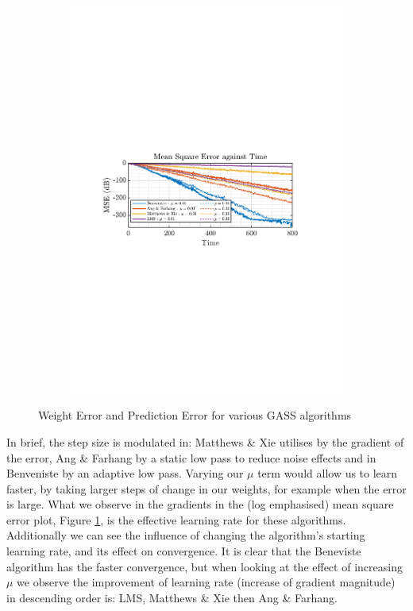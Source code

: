\documentclass[12pt]{article}
\numberwithin{equation}{section}
\begin{document}
\begin{figure}[H]
				\begin{subfigure}{0.49\textwidth}
					\centering
					\includegraphics[trim={2.2cm 11.2cm 3.15cm  11.2cm}, clip, width=\textwidth]{../MATLAB/figures/q2_2a_fig04.pdf} 
					\captionsetup{justification=centering}
				\end{subfigure}
				\captionsetup{justification=centering}
				\caption{Weight Error and Prediction Error for various GASS algorithms}
				\label{fig: 2-2a}
			\end{figure}
			In brief, the step size is modulated in: Matthews \& Xie utilises by the gradient of the error, Ang \& Farhang by a static low pass to reduce noise effects and in Benveniste by an adaptive low pass.
			Varying our $\mu$ term would allow us to learn faster, by taking larger steps of change in our weights, for example when the error is large. What we observe in the gradients in the (log emphasised) mean square error plot, Figure \ref{fig: 2-2a}, is the effective learning rate for these algorithms. Additionally we can see the influence of changing the algorithm's starting learning rate, and its effect on convergence. It is clear that the Beneviste algorithm has the faster convergence, but when looking at the effect of increasing $\mu$ we observe the improvement of learning rate (increase of gradient magnitude) in descending order is: LMS, Matthews \& Xie then Ang \& Farhang.\\
\end{document}

